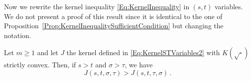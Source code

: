 Now we rewrite the kernel inequality \eqref{Eq:KernelInequality} in $(s,t)$ variables. We
do not present a proof of this result since it is identical to the one of
Proposition~\ref{Prop:KernelInequalitySufficientCondition} but changing the notation.

\begin{lemma}
\label{Lemma:KernelInequalityCone} Let $m\geq 1$ and let $J$ the kernel defined in
\eqref{Eq:KernelSTVariables2} with $K(\sqrt{\cdot})$ strictly convex. Then, if $s>t$ and $\sigma > \tau$, we have
\begin{equation*}
J(s,t,\sigma, \tau) > J(s,t,\tau, \sigma)\,.
\end{equation*}
\end{lemma}

%
%
